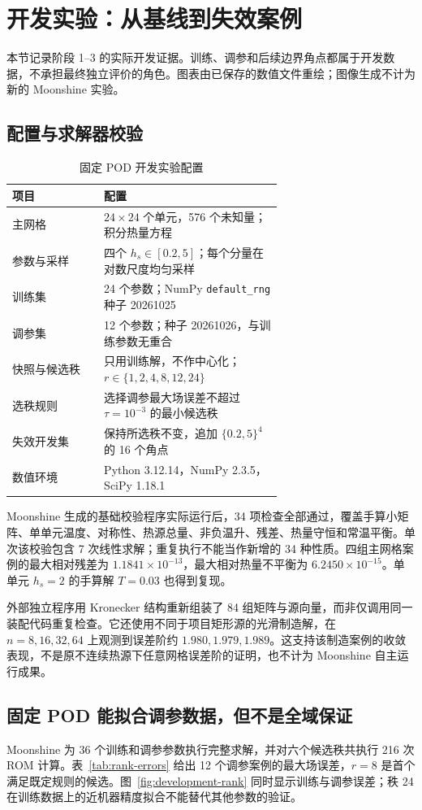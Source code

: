 \section{开发实验：从基线到失效案例}
本节记录阶段 1--3 的实际开发证据。训练、调参和后续边界角点都属于开发数据，不承担最终独立评价的角色。图表由已保存的数值文件重绘；图像生成不计为新的 Moonshine 实验。

\subsection{配置与求解器校验}
\begin{table}[htbp]
\centering
\caption{固定 POD 开发实验配置}
\label{tab:development-config}
\small
\begin{tabular}{lp{0.66\linewidth}}
\toprule
项目 & 配置 \\
\midrule
主网格 & $24\times24$ 个单元，576 个未知量；积分热量方程 \\
参数与采样 & 四个 $h_s\in[0.2,5]$；每个分量在对数尺度均匀采样 \\
训练集 & 24 个参数；NumPy \texttt{default\_rng} 种子 20261025 \\
调参集 & 12 个参数；种子 20261026，与训练参数无重合 \\
快照与候选秩 & 只用训练解，不作中心化；$r\in\{1,2,4,8,12,24\}$ \\
选秩规则 & 选择调参最大场误差不超过 $\tau=10^{-3}$ 的最小候选秩 \\
失效开发集 & 保持所选秩不变，追加 $\{0.2,5\}^4$ 的 16 个角点 \\
数值环境 & Python 3.12.14，NumPy 2.3.5，SciPy 1.18.1 \\
\bottomrule
\end{tabular}
\end{table}

Moonshine 生成的基础校验程序实际运行后，34 项检查全部通过，覆盖手算小矩阵、单单元温度、对称性、热源总量、非负温升、残差、热量守恒和常温平衡。单次该校验包含 7 次线性求解；重复执行不能当作新增的 34 种性质。四组主网格案例的最大相对残差为 $1.1841\times10^{-13}$，最大相对热量不平衡为 $6.2450\times10^{-15}$。单单元 $h_s=2$ 的手算解 $T=0.03$ 也得到复现。

外部独立程序用 Kronecker 结构重新组装了 84 组矩阵与源向量，而非仅调用同一装配代码重复检查。它还使用不同于项目矩形源的光滑制造解，在 $n=8,16,32,64$ 上观测到误差阶约 $1.980,1.979,1.989$。这支持该制造案例的收敛表现，不是原不连续热源下任意网格误差阶的证明，也不计为 Moonshine 自主运行成果。

\subsection{固定 POD 能拟合调参数据，但不是全域保证}
Moonshine 为 36 个训练和调参参数执行完整求解，并对六个候选秩共执行 216 次 ROM 计算。表~\ref{tab:rank-errors} 给出 12 个调参案例的最大场误差，$r=8$ 是首个满足既定规则的候选。图~\ref{fig:development-rank} 同时显示训练与调参误差；秩 24 在训练数据上的近机器精度拟合不能替代其他参数的验证。

